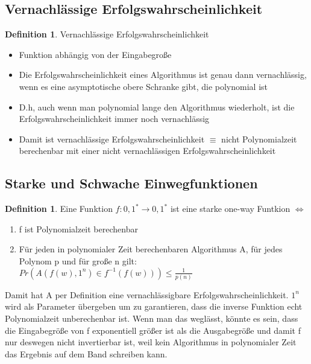 \documentclass[12pt,a4paper]{article}
\theoremstyle{definition}
\newtheorem{definition}[theorem]{Definition}
\begin{document}
    \subsection{Vernachlässige Erfolgswahrscheinlichkeit}

    \begin{definition}
        Vernachlässige Erfolgswahrscheinlichkeit
        \begin{itemize}
            \item Funktion abhängig von der Eingabegroße
            \item Die Erfolgswahrscheinlichkeit eines Algorithmus ist genau dann vernachlässig, wenn es eine
                asymptotische obere Schranke gibt, die polynomial ist
            \item D.h, auch wenn man polynomial lange den Algorithmus wiederholt, ist die Erfolgswahrscheinlichkeit
                immer noch vernachlässig
            \item Damit ist vernachlässige Erfolgswahrscheinlichkeit $\equiv$ nicht Polynomialzeit berechenbar
                mit einer nicht vernachlässigen Erfolgswahrscheinlichkeit
        \end{itemize}
    \end{definition}

    \subsection{Starke und Schwache Einwegfunktionen}

    \begin{definition}
        Eine Funktion $f: {0, 1}^* \longrightarrow {0, 1}^*$ ist eine starke one-way Funtkion $\Leftrightarrow$
        \begin{enumerate}
            \item f ist Polynomialzeit berechenbar
            \item Für jeden in polynomialer Zeit berechenbaren Algorithmus A, für jedes Polynom p und für große n gilt: \\
            $Pr(A(f(w), 1^n) \in f^{-1}(f(w))) \leq \frac{1}{p(n)}$
        \end{enumerate}

        Damit hat A per Definition eine vernachlässigbare Erfolgswahrscheinlichkeit. $1^n$ wird als Parameter übergeben um zu
        garantieren, dass die inverse Funktion echt Polynomialzeit unberechenbar ist. Wenn man das weglässt, könnte es sein,
        dass die Eingabegröße von f exponentiell größer ist als die Ausgabegröße und damit f nur deswegen nicht invertierbar
        ist, weil kein Algorithmus in polynomialer Zeit das Ergebnis auf dem Band schreiben kann.
    \end{definition}
\end{document}

